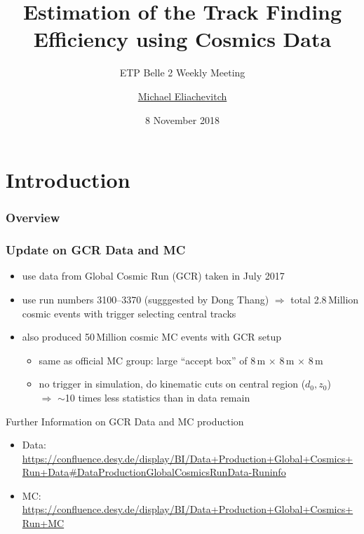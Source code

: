 \documentclass[18pt]{beamer}
\title{Estimation of the Track Finding Efficiency using Cosmics Data}
\subtitle{ETP Belle 2 Weekly Meeting}
\author{\underline{Michael Eliachevitch}}
\date{8 November 2018}
\institute{ETP -- KIT}
\begin{document}

\section{Introduction}
\begin{frame}
  \titlepage
\end{frame}

\begin{frame}
  \frametitle{Overview}
  
\end{frame}

\begin{frame}
  \frametitle{Update on GCR Data and MC}

  \begin{itemize}
  \item use data from Global Cosmic Run (GCR) taken in July 2017
  \item use run numbers 3100--3370 (sugggested by Dong Thang)
    $\Rightarrow$ total 2.8\,Million cosmic events with trigger selecting central tracks\\
  \item also produced 50\,Million cosmic MC events with GCR setup
    \begin{itemize}
    \item same as official MC group: large ``accept box'' of 8\,m $\times$ 8\,m $\times$ 8\,m 
    \item no trigger in simulation, do kinematic cuts on central region ($d_0, z_0$)\\
      $\Rightarrow$  $\sim$10 times less statistics than in data remain
    \end{itemize}
  \end{itemize}

  \begin{block}{Further Information on GCR Data and MC production}
    \begin{itemize}
    \item Data: \footnotesize{\url{https://confluence.desy.de/display/BI/Data+Production+Global+Cosmics+Run+Data\#DataProductionGlobalCosmicsRunData-Runinfo}}
    \item MC: \footnotesize{\url{https://confluence.desy.de/display/BI/Data+Production+Global+Cosmics+Run+MC}}
    \end{itemize}
  \end{block}
  
\end{frame}
\end{document}
